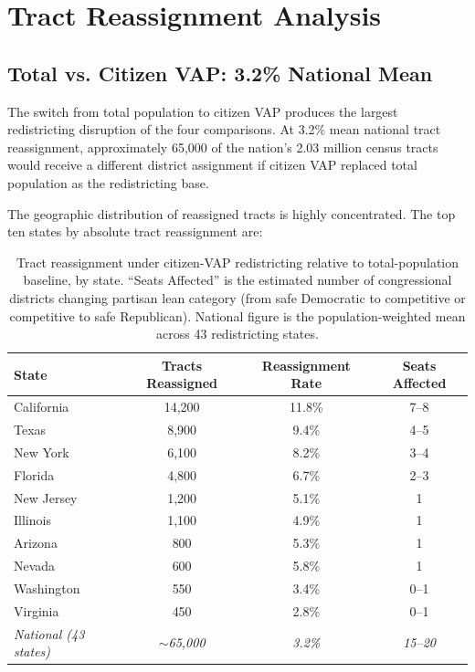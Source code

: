 \section{Tract Reassignment Analysis}
\label{sec:tract_reassignment}

\subsection{Total vs. Citizen VAP: 3.2\% National Mean}

The switch from total population to citizen VAP produces the largest redistricting disruption of the four comparisons. At 3.2\% mean national tract reassignment, approximately 65,000 of the nation's 2.03 million census tracts would receive a different district assignment if citizen VAP replaced total population as the redistricting base.

The geographic distribution of reassigned tracts is highly concentrated. The top ten states by absolute tract reassignment are:

\begin{table}[htbp]
\centering
\begin{tabular}{lccc}
\toprule
\textbf{State} & \textbf{Tracts Reassigned} & \textbf{Reassignment Rate} & \textbf{Seats Affected} \\
\midrule
California & 14,200 & 11.8\% & 7--8 \\
Texas & 8,900 & 9.4\% & 4--5 \\
New York & 6,100 & 8.2\% & 3--4 \\
Florida & 4,800 & 6.7\% & 2--3 \\
New Jersey & 1,200 & 5.1\% & 1 \\
Illinois & 1,100 & 4.9\% & 1 \\
Arizona & 800 & 5.3\% & 1 \\
Nevada & 600 & 5.8\% & 1 \\
Washington & 550 & 3.4\% & 0--1 \\
Virginia & 450 & 2.8\% & 0--1 \\
\midrule
\textit{National (43 states)} & \textit{$\sim$65,000} & \textit{3.2\%} & \textit{15--20} \\
\bottomrule
\end{tabular}
\caption{Tract reassignment under citizen-VAP redistricting relative to total-population baseline, by state. ``Seats Affected'' is the estimated number of congressional districts changing partisan lean category (from safe Democratic to competitive or competitive to safe Republican). National figure is the population-weighted mean across 43 redistricting states.}
\label{tab:cvap_reassignment}
\end{table}

